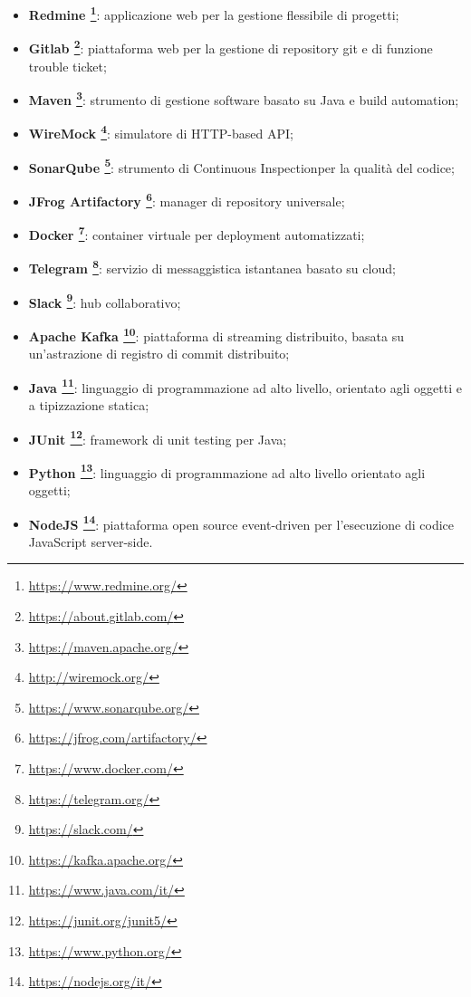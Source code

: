 	\begin{itemize}
		\item \textbf{Redmine \footnote{\hyperref[Link al sito]{https://www.redmine.org/}}}: applicazione web per la gestione flessibile di progetti;
		\item \textbf{Gitlab \footnote{\hyperref[Link al sito]{https://about.gitlab.com/}}}: piattaforma web per la gestione di repository git e di funzione trouble ticket;
		\item \textbf{Maven \footnote{\hyperref[Link al sito]{https://maven.apache.org/}}}: strumento di gestione software basato su Java e build automation;
		\item \textbf{WireMock \footnote{\hyperref[Link al sito]{http://wiremock.org/}}}: simulatore di HTTP-based API;
		\item \textbf{SonarQube \footnote{\hyperref[Link al sito]{https://www.sonarqube.org/}}}: strumento di Continuous Inspection\glossario per la qualità del codice;
		\item \textbf{JFrog Artifactory \footnote{\hyperref[Link al sito]{https://jfrog.com/artifactory/}}}: manager di repository universale;
		\item \textbf{Docker \footnote{\hyperref[Link al sito]{https://www.docker.com/}}}: container virtuale per deployment automatizzati;
		\item \textbf{Telegram \footnote{\hyperref[Link al sito]{https://telegram.org/}}}: servizio di messaggistica istantanea basato su cloud;
		\item \textbf{Slack \footnote{\hyperref[Link al sito]{https://slack.com/}}}: hub collaborativo;
		\item \textbf{Apache Kafka \footnote{\hyperref[Link al sito]{https://kafka.apache.org/}}}: piattaforma di streaming distribuito, basata su un'astrazione di registro di commit distribuito;
		\item \textbf{Java \footnote{\hyperref[Link al sito]{https://www.java.com/it/}}}:  linguaggio di programmazione ad alto livello, orientato agli oggetti e a tipizzazione statica;
		\item \textbf{JUnit \footnote{\hyperref[Link al sito]{https://junit.org/junit5/}}}: framework di unit testing per Java;
		\item \textbf{Python \footnote{\hyperref[Link al sito]{https://www.python.org/}}}: linguaggio di programmazione  ad alto livello orientato agli oggetti;
		\item \textbf{NodeJS \footnote{\hyperref[Link al sito]{https://nodejs.org/it/}}}: piattaforma open source event-driven per l'esecuzione di codice JavaScript server-side.
	\end{itemize}
	
